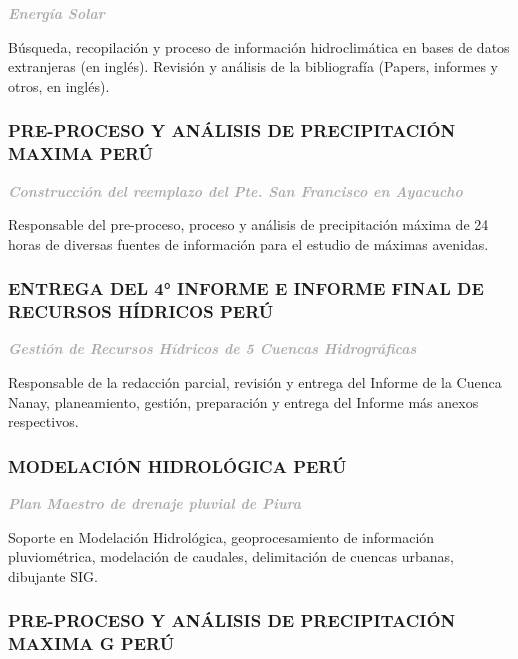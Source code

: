 \documentclass[
  10,
]{article}
\begin{document}
\textcolor{darkgray}{\textbf{\emph{Energía Solar}}}

Búsqueda, recopilación y proceso de información hidroclimática en bases
de datos extranjeras (en inglés). Revisión y análisis de la bibliografía
(Papers, informes y otros, en inglés).

\hypertarget{pre-proceso-y-anuxe1lisis-de-precipitaciuxf3n-maxima-peruxfa}{%
\subsubsection{PRE-PROCESO Y ANÁLISIS DE PRECIPITACIÓN MAXIMA \textbar{}
PERÚ}\label{pre-proceso-y-anuxe1lisis-de-precipitaciuxf3n-maxima-peruxfa}}

\textcolor{darkgray}{\textbf{\emph{Construcción del reemplazo del Pte. San Francisco en Ayacucho}}}

Responsable del pre-proceso, proceso y análisis de precipitación máxima
de 24 horas de diversas fuentes de información para el estudio de
máximas avenidas.

\hypertarget{entrega-del-4-informe-e-informe-final-de-recursos-huxeddricos-peruxfa}{%
\subsubsection{ENTREGA DEL 4° INFORME E INFORME FINAL DE RECURSOS
HÍDRICOS \textbar{}
PERÚ}\label{entrega-del-4-informe-e-informe-final-de-recursos-huxeddricos-peruxfa}}

\textcolor{darkgray}{\textbf{\emph{Gestión de Recursos Hídricos de 5 Cuencas Hidrográficas}}}

Responsable de la redacción parcial, revisión y entrega del Informe de
la Cuenca Nanay, planeamiento, gestión, preparación y entrega del
Informe más anexos respectivos.

\hypertarget{modelaciuxf3n-hidroluxf3gica-peruxfa}{%
\subsubsection{MODELACIÓN HIDROLÓGICA \textbar{}
PERÚ}\label{modelaciuxf3n-hidroluxf3gica-peruxfa}}

\textcolor{darkgray}{\textbf{\emph{Plan Maestro de drenaje pluvial de Piura}}}

Soporte en Modelación Hidrológica, geoprocesamiento de información
pluviométrica, modelación de caudales, delimitación de cuencas urbanas,
dibujante SIG.

\hypertarget{pre-proceso-y-anuxe1lisis-de-precipitaciuxf3n-maxima-g-peruxfa}{%
\subsubsection{PRE-PROCESO Y ANÁLISIS DE PRECIPITACIÓN MAXIMA \textbar{}
G \textbar{}
PERÚ}\label{pre-proceso-y-anuxe1lisis-de-precipitaciuxf3n-maxima-g-peruxfa}}
\end{document}
